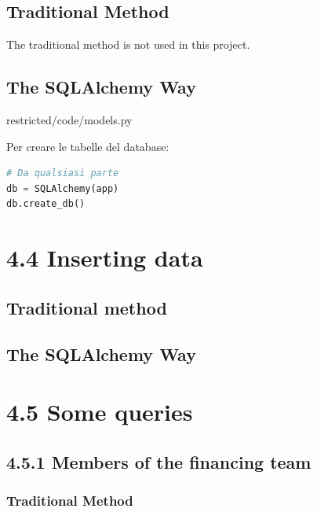 \subsection*{Traditional Method}
The traditional method is not used in this project.


\subsection*{The SQLAlchemy Way}
\begin{verbatim*}
restricted/code/models.py
\end{verbatim*}




Per creare le tabelle del database:
\begin{lstlisting}[language=Python]
# Da qualsiasi parte
db = SQLAlchemy(app)
db.create_db()
\end{lstlisting}


\section*{4.4 \hspace{1cm} Inserting data}
\subsection*{Traditional method}


\subsection*{The SQLAlchemy Way}



\section*{4.5 \hspace{1cm} Some queries}
\subsection*{4.5.1 \hspace{1cm} Members of the financing team}
\subsubsection*{Traditional Method}


